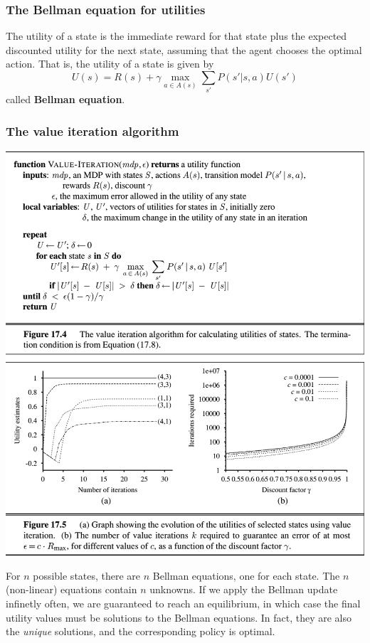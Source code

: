 \documentclass{scrartcl}
\begin{document}
\subsubsection{The Bellman equation for utilities}
The utility of a state is the immediate reward for that state plus the expected discounted utility for the next state, assuming that the agent chooses the optimal action. That is, the utility of a state is given by
\[U(s) = R(s) + \gamma \max_{a\in A(s)} \sum_{s'} P(s'|s,a) U(s')\]
called \textbf{Bellman equation}.

\subsubsection{The value iteration algorithm}
\begin{center}
    \includegraphics[scale=0.4]{img/valiter.png}
\end{center}

For \(n\) possible states, there are \(n\) Bellman equations, one for each state. The \(n\) (non-linear) equations contain \(n\) unknowns. If we apply the Bellman update infinetly often, we are guaranteed to reach an equilibrium, in which case the final utility values must be solutions to the Bellman equations. In fact, they are also the \textit{unique} solutions, and the corresponding policy is optimal.
\end{document}
